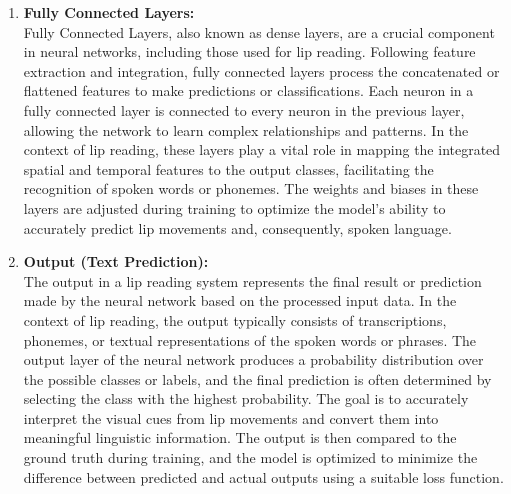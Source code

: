 \begin{enumerate}
	\item \textbf{Fully Connected Layers:}
	\\Fully Connected Layers, also known as dense layers, are a crucial component in neural networks, including those used for lip reading. Following feature extraction and integration, fully connected layers process the concatenated or flattened features to make predictions or classifications. Each neuron in a fully connected layer is connected to every neuron in the previous layer, allowing the network to learn complex relationships and patterns. In the context of lip reading, these layers play a vital role in mapping the integrated spatial and temporal features to the output classes, facilitating the recognition of spoken words or phonemes. The weights and biases in these layers are adjusted during training to optimize the model's ability to accurately predict lip movements and, consequently, spoken language.

	\item \textbf{Output (Text Prediction):}
	\\The output in a lip reading system represents the final result or prediction made by the neural network based on the processed input data. In the context of lip reading, the output typically consists of transcriptions, phonemes, or textual representations of the spoken words or phrases. The output layer of the neural network produces a probability distribution over the possible classes or labels, and the final prediction is often determined by selecting the class with the highest probability. The goal is to accurately interpret the visual cues from lip movements and convert them into meaningful linguistic information. The output is then compared to the ground truth during training, and the model is optimized to minimize the difference between predicted and actual outputs using a suitable loss function.

\end{enumerate}
